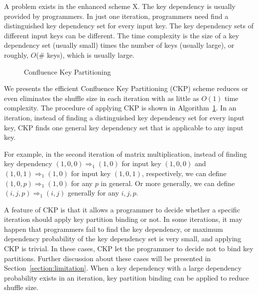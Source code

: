 \documentclass[10pt,journal,compsoc]{IEEEtran}
\makeatletter
\newcommand{\removelatexerror}{\let\@latex@error\@gobble}
\makeatother
\begin{document}
A problem exists in the enhanced scheme X. 
The key dependency is usually provided by programmers.
In just one iteration, programmers need find a distinguished
key dependency set for every input key. 
The key dependency sets of different input keys can be different. 
The time complexity is the size of a key dependency set (usually small) 
times the number of keys (usually large), 
or roughly, $O$(\# keys), which is usually large. 

\begin{figure}[!t]
\removelatexerror

\begin{algorithm}[H]

\caption{Confluence Key Partitioning}
\label{algo:CKP}
\end{algorithm}
\end{figure}

We presents the efficient Confluence Key Partitioning (CKP) scheme reduces or even eliminates 
the shuffle size in each iteration with as little as $O(1)$ time complexity. 
The procedure of applying CKP is shown in Algorithm~\ref{algo:CKP}.
In an iteration, instead of finding a distinguished key dependency set for 
every input key, CKP finds one general key dependency set that is applicable 
to any input key. 

For example, in the second iteration of matrix multiplication, 
instead of finding key dependency $(1, 0, 0) \Rightarrow_{1} (1, 0)$ 
for input key $(1,0,0)$ and $(1,0,1) \Rightarrow_{1} (1,0)$ 
for input key $(1,0,1)$, respectively, 
we can define $(1, 0, p) \Rightarrow_{1} (1,0)$ for any $p$ in general. 
Or more generally, we can define $(i, j, p) \Rightarrow_{1} (i, j)$ 
generally for any $i, j, p$. 

A feature of CKP is that it allows a programmer to decide whether a specific iteration should apply key partition binding or not. 
In some iterations, it may happen that programmers fail to find the key dependency, 
or maximum dependency probability of the key dependency set is very small, 
and applying CKP is trivial. 
In these cases, CKP let the programmer to decide not to bind key partitions. 
Further discussion about these cases will be presented in Section~\ref{section:limitation}.
When a key dependency with a large dependency probability exists in an iteration, key partition binding can be applied to reduce shuffle size.
\end{document}
